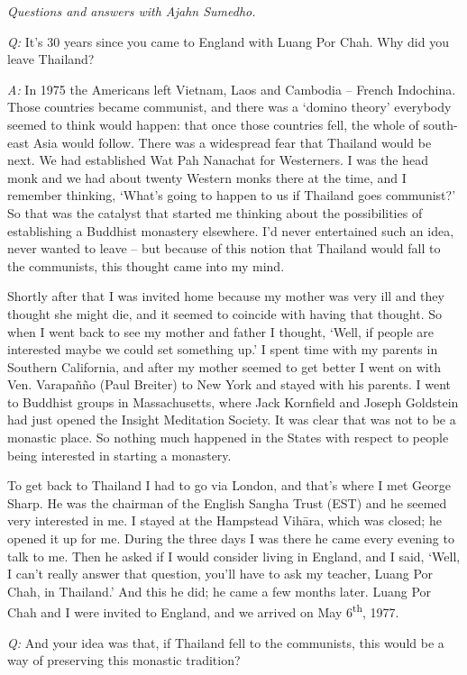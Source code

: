 
\emph{Questions and answers with Ajahn Sumedho.}

\emph{Q:} It's 30 years since you came to England with Luang Por Chah. Why did
you leave Thailand?

\emph{A:} In 1975 the Americans left Vietnam, Laos and Cambodia --
French Indochina. Those countries became communist, and there was a
`domino theory' everybody seemed to think would happen: that once those
countries fell, the whole of south-east Asia would follow. There was a
widespread fear that Thailand would be next. We had established Wat Pah
Nanachat for Westerners. I was the head monk and we had about twenty
Western monks there at the time, and I remember thinking, `What's going
to happen to us if Thailand goes communist?' So that was the catalyst
that started me thinking about the possibilities of establishing a
Buddhist monastery elsewhere. I'd never entertained such an idea, never
wanted to leave -- but because of this notion that Thailand would fall
to the communists, this thought came into my mind. 

Shortly after that I was invited home because my mother was very ill and
they thought she might die, and it seemed to coincide with having that
thought. So when I went back to see my mother and father I thought, 
`Well, if people are interested maybe we could set something up.' I
spent time with my parents in Southern California, and after my mother
seemed to get better I went on with Ven. Varapañño (Paul Breiter) to New
York and stayed with his parents. I went to Buddhist groups in
Massachusetts, where Jack Kornfield and Joseph Goldstein had just opened
the Insight Meditation Society. It was clear that was not to be a
monastic place. So nothing much happened in the States with respect to
people being interested in starting a monastery. 

To get back to Thailand I had to go via London, and that's where I met
George Sharp. He was the chairman of the English Sangha Trust (EST) and
he seemed very interested in me. I stayed at the Hampstead Vihāra, which
was closed; he opened it up for me. During the three days I was there he
came every evening to talk to me. Then he asked if I would consider
living in England, and I said, `Well, I can't really answer that
question, you'll have to ask my teacher, Luang Por Chah, in Thailand.'
And this he did; he came a few months later. Luang Por Chah and I were
invited to England, and we arrived on May 6\textsuperscript{th}, 1977. 

\emph{Q:} And your idea was that, if Thailand fell to the communists, this
would be a way of preserving this monastic tradition? 

